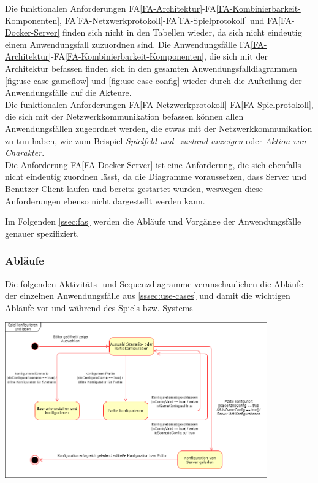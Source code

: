 \documentclass[12pt]{article}
\newcounter{fa}
\newcounter{nfa}
\newcommand{\mfaref}[1]{FA\ref{#1}}
\begin{document}
\vspace{0.5cm}

Die funktionalen Anforderungen \mfaref{FA-Architektur}-\mfaref{FA-Kombinierbarkeit-Komponenten}, \mfaref{FA-Netzwerkprotokoll}-\mfaref{FA-Spielprotokoll} und \mfaref{FA-Docker-Server} finden sich nicht in den Tabellen wieder, da sich nicht eindeutig einem Anwendungsfall zuzuordnen sind. Die Anwendungsfälle \mfaref{FA-Architektur}-\mfaref{FA-Kombinierbarkeit-Komponenten}, die sich mit der Architektur befassen finden sich in den gesamten Anwendungsfalldiagrammen \autoref{fig:use-case-gameflow} und \autoref{fig:use-case-config} wieder durch die Aufteilung der Anwendungsfälle auf die Akteure. \\ Die funktionalen Anforderungen \mfaref{FA-Netzwerkprotokoll}-\mfaref{FA-Spielprotokoll}, die sich mit der Netzwerkkommunikation befassen können allen Anwendungsfällen zugeordnet werden, die etwas mit der Netzwerkkommunikation zu tun haben, wie zum Beispiel \textit{Spielfeld und -zustand anzeigen} oder \textit{Aktion von Charakter}. \\ Die Anforderung \mfaref{FA-Docker-Server} ist eine Anforderung, die sich ebenfalls nicht eindeutig zuordnen lässt, da die Diagramme voraussetzen, dass Server und Benutzer-Client laufen und bereits gestartet wurden, weswegen diese Anforderungen ebenso nicht dargestellt werden kann. \par \par 
Im Folgenden \autoref{ssec:fas} werden die Abläufe und Vorgänge der Anwendungsfälle genauer spezifiziert. 

\subsubsection{Abläufe}
\label{ssec:processes}

Die folgenden Aktivitäts- und Sequenzdiagramme veranschaulichen die Abläufe der einzelnen Anwendungsfälle aus \autoref{sssec:use-cases} und damit die wichtigen Abläufe vor und während des Spiels bzw. Systems

\begin{center}
\includegraphics[width=0.85\textwidth]{images/Spiel_konfigurieren}
\end{center}
\end{document}
